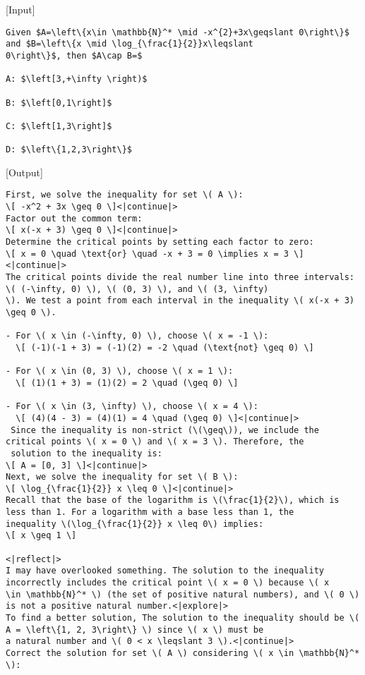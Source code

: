 \begin{tcolorbox}[gray_box, title = {{Synthetic Data Example Type III-I: Correct mistake}}]\tiny
[Input]
\begin{verbatim}
Given $A=\left\{x\in \mathbb{N}^* \mid -x^{2}+3x\geqslant 0\right\}$ and $B=\left\{x \mid \log_{\frac{1}{2}}x\leqslant 
0\right\}$, then $A\cap B=$

A: $\left[3,+\infty \right)$

B: $\left[0,1\right]$

C: $\left[1,3\right]$

D: $\left\{1,2,3\right\}$
\end{verbatim}

\hdashrule[0.5ex]{\linewidth}{0.1mm}{0.1mm} %

[Output]
\begin{verbatim}
First, we solve the inequality for set \( A \):
\[ -x^2 + 3x \geq 0 \]<|continue|>
Factor out the common term:
\[ x(-x + 3) \geq 0 \]<|continue|>
Determine the critical points by setting each factor to zero:
\[ x = 0 \quad \text{or} \quad -x + 3 = 0 \implies x = 3 \]<|continue|>
The critical points divide the real number line into three intervals: \( (-\infty, 0) \), \( (0, 3) \), and \( (3, \infty) 
\). We test a point from each interval in the inequality \( x(-x + 3) \geq 0 \).

- For \( x \in (-\infty, 0) \), choose \( x = -1 \):
  \[ (-1)(-1 + 3) = (-1)(2) = -2 \quad (\text{not} \geq 0) \]

- For \( x \in (0, 3) \), choose \( x = 1 \):
  \[ (1)(1 + 3) = (1)(2) = 2 \quad (\geq 0) \]

- For \( x \in (3, \infty) \), choose \( x = 4 \):
  \[ (4)(4 - 3) = (4)(1) = 4 \quad (\geq 0) \]<|continue|>
 Since the inequality is non-strict (\(\geq\)), we include the critical points \( x = 0 \) and \( x = 3 \). Therefore, the 
 solution to the inequality is:
\[ A = [0, 3] \]<|continue|>
Next, we solve the inequality for set \( B \):
\[ \log_{\frac{1}{2}} x \leq 0 \]<|continue|>
Recall that the base of the logarithm is \(\frac{1}{2}\), which is less than 1. For a logarithm with a base less than 1, the 
inequality \(\log_{\frac{1}{2}} x \leq 0\) implies:
\[ x \geq 1 \]

<|reflect|>
I may have overlooked something. The solution to the inequality incorrectly includes the critical point \( x = 0 \) because \( x 
\in \mathbb{N}^* \) (the set of positive natural numbers), and \( 0 \) is not a positive natural number.<|explore|>
To find a better solution, The solution to the inequality should be \( A = \left\{1, 2, 3\right\} \) since \( x \) must be 
a natural number and \( 0 < x \leqslant 3 \).<|continue|>
Correct the solution for set \( A \) considering \( x \in \mathbb{N}^* \):


\end{verbatim}
\end{tcolorbox}
